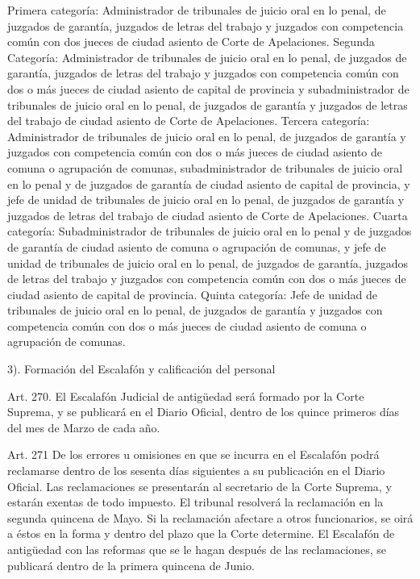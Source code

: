    Primera categoría: Administrador de tribunales de juicio oral en lo penal, de juzgados de garantía, juzgados de letras del trabajo y juzgados con competencia común con dos jueces de ciudad asiento de Corte de Apelaciones.
    Segunda Categoría: Administrador de tribunales de juicio oral en lo penal, de juzgados de garantía, juzgados de letras del trabajo y juzgados con competencia común con dos o más jueces de ciudad asiento de capital de provincia y subadministrador de tribunales de juicio oral en lo penal, de juzgados de garantía y juzgados de letras del trabajo de ciudad asiento de Corte de Apelaciones.
    Tercera categoría: Administrador de tribunales de juicio oral en lo penal, de juzgados de garantía y juzgados con competencia común con dos o más jueces de ciudad asiento de comuna o agrupación de comunas, subadministrador de tribunales de juicio oral en lo penal y de juzgados de garantía de ciudad asiento de capital de provincia, y jefe de unidad de tribunales de juicio oral en lo penal, de juzgados de garantía y juzgados de letras del trabajo de ciudad asiento de Corte de Apelaciones.
    Cuarta categoría: Subadministrador de tribunales de juicio oral en lo penal y de juzgados de garantía de ciudad asiento de comuna o agrupación de comunas, y jefe de unidad de tribunales de juicio oral en lo penal, de juzgados de garantía, juzgados de letras del trabajo y juzgados con competencia común con dos o más jueces de ciudad asiento de capital de provincia.
    Quinta categoría: Jefe de unidad de tribunales de juicio oral en lo penal, de juzgados de garantía y juzgados con competencia común con dos o más jueces de ciudad asiento de comuna o agrupación de comunas.



    3). Formación del Escalafón y calificación del personal


    Art. 270. El Escalafón Judicial de antigüedad será formado por la Corte Suprema, y se publicará en el Diario Oficial, dentro de los quince primeros días del mes de Marzo de cada año.

    Art. 271 De los errores u omisiones en que se incurra en el Escalafón podrá reclamarse dentro de los sesenta días siguientes a su publicación en el Diario Oficial.
    Las reclamaciones se presentarán al secretario de la Corte Suprema, y estarán exentas de todo impuesto.
    El tribunal resolverá la reclamación en la segunda quincena de Mayo. Si la reclamación afectare a otros funcionarios, se oirá a éstos en la forma y dentro del plazo que la Corte determine. El Escalafón de antigüedad con las reformas que se le hagan después de las reclamaciones, se publicará dentro de la primera quincena de Junio.


